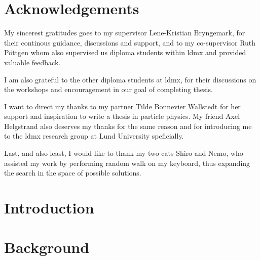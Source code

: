 \clearpage
\thispagestyle{empty}
\section*{Acknowledgements}

My sincerest gratitudes goes to my supervisor Lene-Kristian Bryngemark, for their continous guidance, discussions and support, and to my co-supervisor Ruth Pöttgen whom also supervised us diploma students within \gls{ldmx} and provided valuable feedback. 

I am also grateful to the other diploma students at \gls{ldmx}, for their discussions on the workshops and encouragement in our goal of completing thesis. 

I want to direct my thanks to my partner Tilde Bonnevier Wallstedt for her support and inspiration to write a thesis in particle physics. My friend Axel Helgstrand also deserves my thanks for the same reason and for introducing me to the \gls{ldmx} research group at Lund University speficially. 

Last, and also least, I would like to thank my two cats Shiro and Nemo, who assisted my work by performing random walk on my keyboard, thus expanding the search in the space of possible solutions.

\clearpage
\tableofcontents

\clearpage
{} %
%

\newpage
\section{Introduction}


\newpage
\section{Background}


